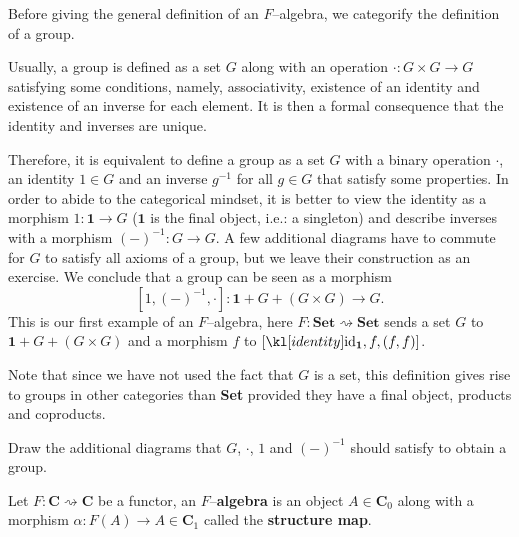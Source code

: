 \documentclass[main.tex]{subfiles}
\begin{document}
Before giving the general definition of an $F$--algebra, we categorify the definition of a group.
\begin{exmp}\label{exmpgroup}
	Usually, a group is defined as a set $G$ along with an operation $\cdot: G\times G\rightarrow G$ satisfying some conditions, namely, associativity, existence of an identity and existence of an inverse for each element. It is then a formal consequence that the identity and inverses are unique.
	
	Therefore, it is equivalent to define a group as a set $G$ with a binary operation $\cdot$, an identity $1 \in G$ and an inverse $g^{-1}$ for all $g \in G$ that satisfy some properties. In order to abide to the categorical mindset, it is better to view the identity as a morphism $1: \mathbf{1} \rightarrow G$ ($\mathbf{1}$ is the final object, i.e.: a singleton) and describe inverses with a morphism $(-)^{-1} : G \rightarrow G$. A few additional diagrams have to commute for $G$ to satisfy all axioms of a group, but we leave their construction as an exercise. We conclude that a group can be seen as a morphism \[[1,(-)^{-1}, \cdot] : \mathbf{1} + G + (G\times G) \rightarrow G.\]
	This is our first example of an $F$--algebra, here $F:\textbf{Set}\rightsquigarrow \textbf{Set}$ sends a set $G$ to $\mathbf{1}+G+(G\times G)$ and a morphism $f$ to $[\id_{\mathbf{1}}, f, (f,f)]$.
	
	Note that since we have not used the fact that $G$ is a set, this definition gives rise to groups in other categories than \textbf{Set} provided they have a final object, products and coproducts.
\end{exmp}
\begin{exer}[1pt]
    Draw the additional diagrams that $G$, $\cdot$, $1$ and $(-)^{-1}$ should satisfy to obtain a group.
\end{exer}
\begin{defn}[$F$--algebra]
    Let $F:\mathbf{C}\rightsquigarrow \mathbf{C}$ be a functor, an $F$--\textbf{algebra} is an object $A \in \mathbf{C}_0$ along with a morphism $\alpha: F(A) \rightarrow A \in \mathbf{C}_1$ called the \textbf{structure map}.
\end{defn}
\end{document}
